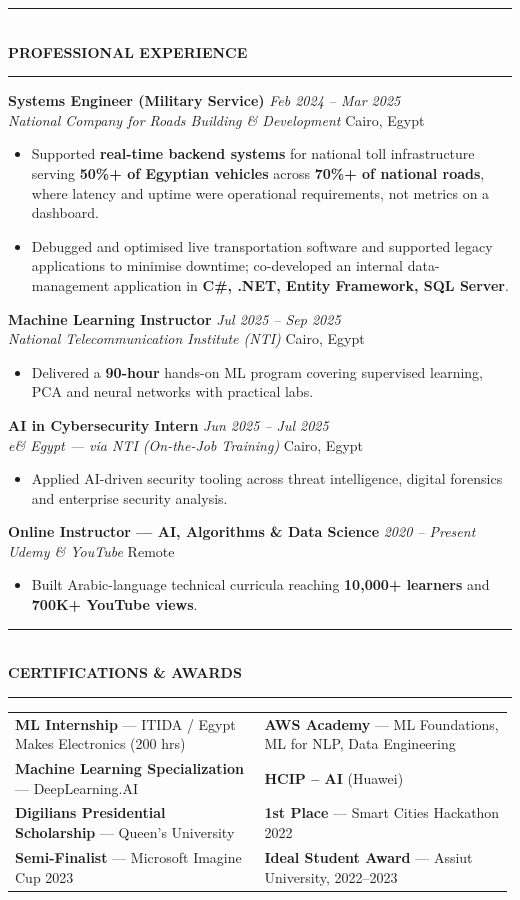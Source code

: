 \documentclass[10pt, a4paper]{article}
\makeatletter
\newcommand{\cvsection}[1]{%
  \vspace{3pt}%
  {\color{navy}\rule{\linewidth}{1.1pt}}\\[0.5pt]%
  {\color{navy}\bfseries\fontsize{9.5}{11}\selectfont\uppercase{#1}}\\[-4pt]%
  {\color{teal}\rule{\linewidth}{0.6pt}}%
  \vspace{2pt}%
}
\newcommand{\cventry}[4]{%
  \vspace{2.5pt}%
  \textbf{\color{darkgray}#1} \hfill {\color{midgray}\textit{#3}}\\[-1.5pt]%
  {\color{teal}\textit{#2}} \hfill {\color{midgray}#4}%
}
\newenvironment{cvitems}{%
  \begin{itemize}[leftmargin=11pt, itemsep=0.5pt, parsep=0pt, topsep=1pt,
                  label={\textcolor{teal}{$\bullet$}}]
}{%
  \end{itemize}%
}
\newenvironment{dualcol}{%
  \begin{tabular*}{\linewidth}{@{}p{0.495\linewidth}@{\hspace{0.01\linewidth}}p{0.495\linewidth}@{}}
}{%
  \end{tabular*}%
}
\makeatother
\begin{document}
\cvsection{Professional Experience}

\cventry{Systems Engineer (Military Service)}{National Company for Roads Building \& Development}
        {Feb 2024 -- Mar 2025}{Cairo, Egypt}
\begin{cvitems}
  \item Supported \textbf{real-time backend systems} for national toll infrastructure serving \textbf{50\%+ of Egyptian vehicles} across \textbf{70\%+ of national roads}, where latency and uptime were operational requirements, not metrics on a dashboard.
  \item Debugged and optimised live transportation software and supported legacy applications to minimise downtime; co-developed an internal data-management application in \textbf{C\#, .NET, Entity Framework, SQL Server}.
\end{cvitems}

\cventry{Machine Learning Instructor}{National Telecommunication Institute (NTI)}
        {Jul 2025 -- Sep 2025}{Cairo, Egypt}
\begin{cvitems}
  \item Delivered a \textbf{90-hour} hands-on ML program covering supervised learning, PCA and neural networks with practical labs.
\end{cvitems}

\cventry{AI in Cybersecurity Intern}{e\& Egypt --- via NTI (On-the-Job Training)}
        {Jun 2025 -- Jul 2025}{Cairo, Egypt}
\begin{cvitems}
  \item Applied AI-driven security tooling across threat intelligence, digital forensics and enterprise security analysis.
\end{cvitems}

\cventry{Online Instructor --- AI, Algorithms \& Data Science}{Udemy \& YouTube}
        {2020 -- Present}{Remote}
\begin{cvitems}
  \item Built Arabic-language technical curricula reaching \textbf{10,000+ learners} and \textbf{700K+ YouTube views}.
\end{cvitems}

\cvsection{Certifications \& Awards}

\begin{dualcol}
  \textbf{ML Internship} --- ITIDA / Egypt Makes Electronics (200 hrs) &
  \textbf{AWS Academy} --- ML Foundations, ML for NLP, Data Engineering \\[2pt]
  \textbf{Machine Learning Specialization} --- DeepLearning.AI &
  \textbf{HCIP -- AI} (Huawei) \\[2pt]
  \textbf{Digilians Presidential Scholarship} --- Queen's University &
  \textbf{1st Place} --- Smart Cities Hackathon 2022 \\[2pt]
  \textbf{Semi-Finalist} --- Microsoft Imagine Cup 2023 &
  \textbf{Ideal Student Award} --- Assiut University, 2022--2023 \\
\end{dualcol}
\end{document}
